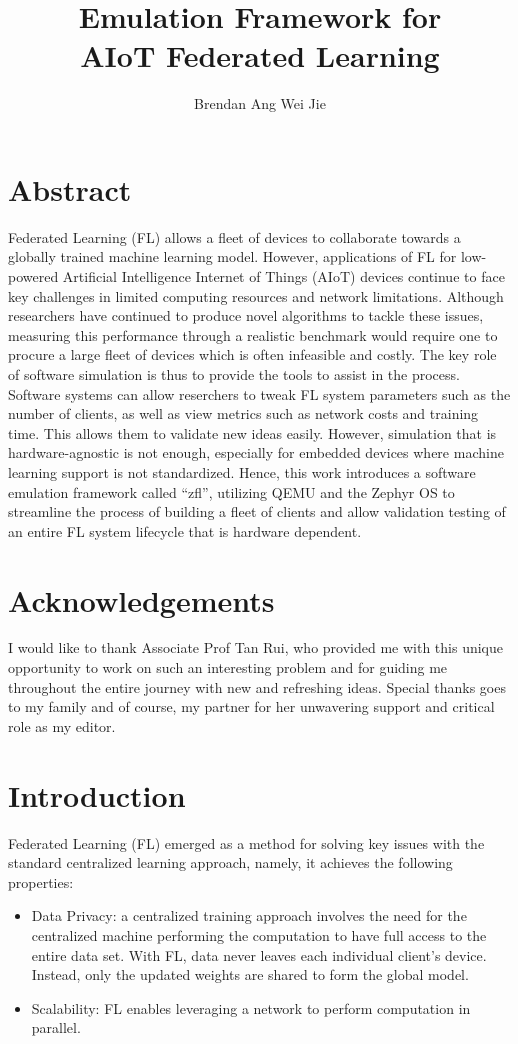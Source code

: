 \documentclass[12pt]{article}
\title{Emulation Framework for\protect\\ AIoT Federated Learning}
\author{Brendan Ang Wei Jie}
\begin{document}
\maketitle

\pagebreak
\section{Abstract}
Federated Learning (FL) allows a fleet of devices to collaborate towards a globally trained machine
learning model. However, applications of FL for low-powered Artificial Intelligence Internet of Things (AIoT)
devices continue to face key challenges in limited computing resources and network limitations. Although
researchers have continued to produce novel algorithms to tackle these issues, measuring this performance through a realistic benchmark would require
one to procure a large fleet of devices which is often infeasible and costly. The key role
of software simulation is thus to provide the tools to assist in the process. Software systems can allow
reserchers to tweak FL system parameters such as the number of clients, as well as view metrics such
as network costs and training time. This allows them to validate new ideas easily. However,
simulation that is hardware-agnostic is not enough, especially for embedded devices where machine
learning support is not standardized. Hence, this work introduces a software emulation framework
called ``zfl'', utilizing QEMU
and the Zephyr OS to streamline the process of building a fleet of clients and allow validation
testing of an entire FL system lifecycle that is hardware dependent.

\section{Acknowledgements}
I would like to thank Associate Prof Tan Rui, who provided me with this unique opportunity to work
on such an interesting problem and for guiding me throughout the entire journey with new and
refreshing ideas. Special thanks goes to my family and of course, my
partner for her unwavering support and critical role as my editor.

\pagebreak
\tableofcontents
\listoffigures
\pagebreak

\section{Introduction}
Federated Learning (FL) emerged as a method for solving key issues with the standard centralized learning
approach, namely, it achieves the following properties:
\begin{itemize}
  \item Data Privacy: a centralized training approach involves the need for the centralized
    machine performing the computation to have full access to the entire data set. With FL, data never
    leaves each individual client's device. Instead, only the updated weights are shared to form the
    global model.
  \item Scalability: FL enables leveraging a network to perform computation in parallel.
\end{itemize}
\end{document}
